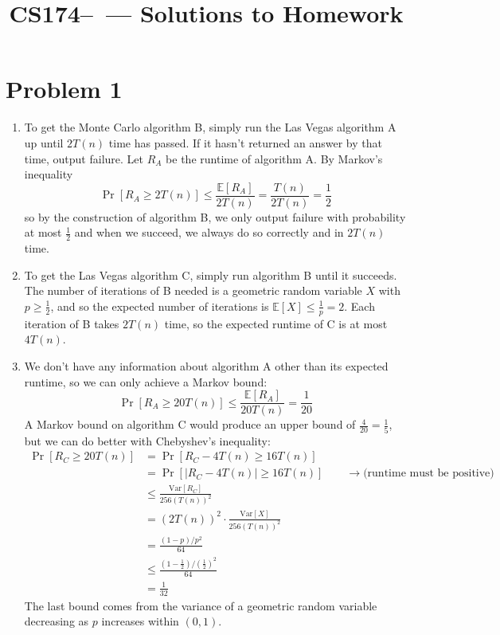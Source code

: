 \documentclass[11pt]{article}
\title{CS174--\Session\  --- Solutions to Homework \Homework}
\author{\Name}
\newcommand{\E}{\mathbb{E}}
\newcommand{\Var}{\text{Var}}
\begin{document}
\maketitle
{}
\setcounter{problemnumber}{0}

\section*{Problem 1}
\begin{enumerate}[1.]
\item To get the Monte Carlo algorithm B, simply run the Las Vegas algorithm A up until $2T(n)$ time has passed. If it hasn't returned an answer by that time, output failure. Let $R_A$ be the runtime of algorithm A. By Markov's inequality $$\Pr[R_A \geq 2T(n)] \leq \frac{\E[R_A]}{2T(n)} = \frac{T(n)}{2T(n)} = \frac12$$ so by the construction of algorithm B, we only output failure with probability at most $\frac12$ and when we succeed, we always do so correctly and in $2T(n)$ time.
\item To get the Las Vegas algorithm C, simply run algorithm B until it succeeds. The number of iterations of B needed is a geometric random variable $X$ with $p\geq\frac12$, and so the expected number of iterations is $\E[X] \leq \frac1p = 2$. Each iteration of B takes $2T(n)$ time, so the expected runtime of C is at most $4T(n)$. 
\item We don't have any information about algorithm A other than its expected runtime, so we can only achieve a Markov bound: $$\Pr[R_A \geq 20T(n)] \leq \frac{\E[R_A]}{20T(n)} = \frac1{20}$$A Markov bound on algorithm C would produce an upper bound of $\frac4{20}=\frac15$, but we can do better with Chebyshev's inequality: \begin{align*}
\Pr[R_C \geq 20T(n)] &= \Pr[R_C - 4T(n) \geq 16T(n)]\\
&= \Pr[|R_C - 4T(n)| \geq 16T(n)] \qquad\rightarrow\text{(runtime must be positive)}\\
&\leq \frac{\Var[R_C]}{256(T(n))^2}\\
&= (2T(n))^2\cdot\frac{\Var[X]}{256(T(n))^2}\\
&= \frac{(1-p)/p^2}{64}\\
&\leq \frac{(1-\frac12)/(\frac12)^2}{64}\\
&= \frac1{32}
\end{align*} 
The last bound comes from the variance of a geometric random variable decreasing as $p$ increases within $(0,1)$.
\end{enumerate}
\end{document}
